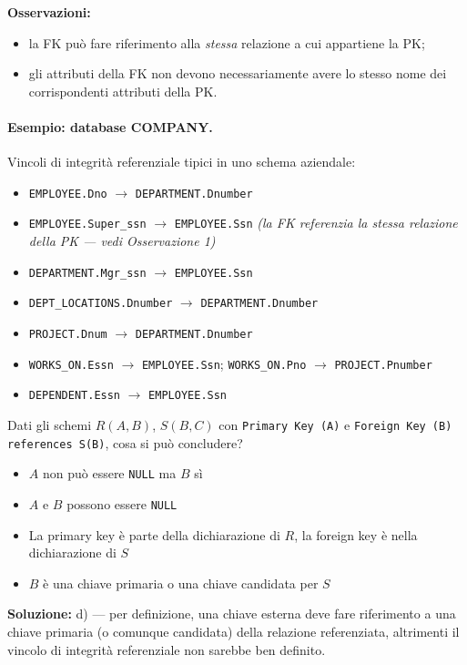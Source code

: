 \documentclass[12pt, a4paper]{article}
\begin{document}
\textbf{Osservazioni:}
\begin{itemize}
    \item la FK può fare riferimento alla \emph{stessa} relazione a cui appartiene la PK;
    \item gli attributi della FK non devono necessariamente avere lo stesso nome dei corrispondenti attributi della PK.
\end{itemize}

\paragraph{Esempio: database COMPANY.} Vincoli di integrità referenziale tipici in uno schema aziendale:
\begin{itemize}
    \item \texttt{EMPLOYEE.Dno} $\rightarrow$ \texttt{DEPARTMENT.Dnumber}
    \item \texttt{EMPLOYEE.Super\_ssn} $\rightarrow$ \texttt{EMPLOYEE.Ssn} \textit{(la FK referenzia la stessa relazione della PK — vedi Osservazione 1)}
    \item \texttt{DEPARTMENT.Mgr\_ssn} $\rightarrow$ \texttt{EMPLOYEE.Ssn}
    \item \texttt{DEPT\_LOCATIONS.Dnumber} $\rightarrow$ \texttt{DEPARTMENT.Dnumber}
    \item \texttt{PROJECT.Dnum} $\rightarrow$ \texttt{DEPARTMENT.Dnumber}
    \item \texttt{WORKS\_ON.Essn} $\rightarrow$ \texttt{EMPLOYEE.Ssn}; \texttt{WORKS\_ON.Pno} $\rightarrow$ \texttt{PROJECT.Pnumber}
    \item \texttt{DEPENDENT.Essn} $\rightarrow$ \texttt{EMPLOYEE.Ssn}
\end{itemize}

\begin{tcolorbox}[colback=lightergray!10, colframe=tocsec, title=\textbf{Esercizio 1}]
Dati gli schemi $R(A,B)$, $S(B,C)$ con \texttt{Primary Key (A)} e \texttt{Foreign Key (B) references S(B)}, cosa si può concludere?
\begin{itemize}
    \item[a)] $A$ non può essere \texttt{NULL} ma $B$ sì
    \item[b)] $A$ e $B$ possono essere \texttt{NULL}
    \item[c)] La primary key è parte della dichiarazione di $R$, la foreign key è nella dichiarazione di $S$
    \item[d)] $B$ è una chiave primaria o una chiave candidata per $S$
\end{itemize}
\end{tcolorbox}
\textbf{Soluzione:} d) — per definizione, una chiave esterna deve fare riferimento a una chiave primaria (o comunque candidata) della relazione referenziata, altrimenti il vincolo di integrità referenziale non sarebbe ben definito.
\end{document}
